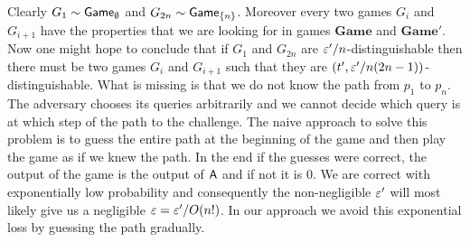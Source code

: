 \documentclass{article}
\def\A{{\sf A}}
\newcommand{\game}{{\sf Game}}
\newcommand{\dgame}{{\mathbf{Game}}}
\begin{document}
\noindent Clearly $G_1 \sim \game_{\emptyset}$ and $G_{2n}\sim\game_{\cub{n}}$. Moreover every two games $G_i$ and $G_{i+1}$ have the properties that we are looking for in games $\dgame$ and $\dgame'$. Now one might hope to conclude that if $G_1$ and $G_{2n}$ are $\varepsilon'/n$-distinguishable then there must be two games $G_i$ and $G_{i+1}$ such that they are $(t',\varepsilon'/n(2n-1))$-distinguishable. What is missing is that we do not know the path from $p_1$ to $p_n$. The adversary chooses its queries arbitrarily and we cannot decide which query is at which step of the path to the challenge. The naive approach to solve this problem is to guess the entire path at the beginning of the game and then play the game as if we knew the path. In the end if the guesses were correct, the output of the game is the output of $\A$ and if not it is 0. We are correct with exponentially low probability and consequently the non-negligible $\varepsilon'$ will most likely give us a negligible $\varepsilon= \varepsilon'/O(n!)$. In our approach we avoid this exponential loss by guessing the path gradually.\\
\end{document}
